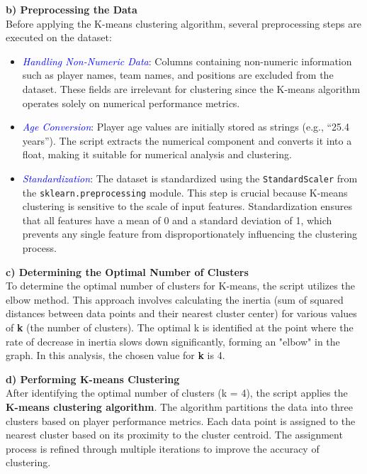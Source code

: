 \documentclass[a4paper,12pt]{article}
\begin{document}
\textbf{b) Preprocessing the Data} \\
Before applying the K-means clustering algorithm, several preprocessing steps are executed on the dataset:
\begin{itemize}
    \item \textit{\textcolor{blue}{Handling Non-Numeric Data}}: Columns containing non-numeric information such as player names, team names, and positions are excluded from the dataset. These fields are irrelevant for clustering since the K-means algorithm operates solely on numerical performance metrics.
    \item \textit{\textcolor{blue}{Age Conversion}}: Player age values are initially stored as strings (e.g., “25.4 years”). The script extracts the numerical component and converts it into a float, making it suitable for numerical analysis and clustering.
    \item \textit{\textcolor{blue}{Standardization}}: 
    The dataset is standardized using the \texttt{StandardScaler} from the \texttt{sklearn.preprocessing}  module. This step is crucial because K-means clustering is sensitive to the scale of input features. Standardization ensures that all features have a mean of 0 and a standard deviation of 1, which prevents any single feature from disproportionately influencing the clustering process.
\end{itemize}

\textbf{c) Determining the Optimal Number of Clusters} \\
To determine the optimal number of clusters for K-means, the script utilizes the elbow method. This approach involves calculating the inertia (sum of squared distances between data points and their nearest cluster center) for various values of \textbf{k} (the number of clusters). The optimal k is identified at the point where the rate of decrease in inertia slows down significantly, forming an "elbow" in the graph. In this analysis, the chosen value for \textbf{k} is 4.

\textbf{d) Performing K-means Clustering} \\
After identifying the optimal number of clusters (k = 4), the script applies the \textbf{K-means clustering algorithm}. The algorithm partitions the data into three clusters based on player performance metrics. Each data point is assigned to the nearest cluster based on its proximity to the cluster centroid. The assignment process is refined through multiple iterations to improve the accuracy of clustering.
\end{document}
